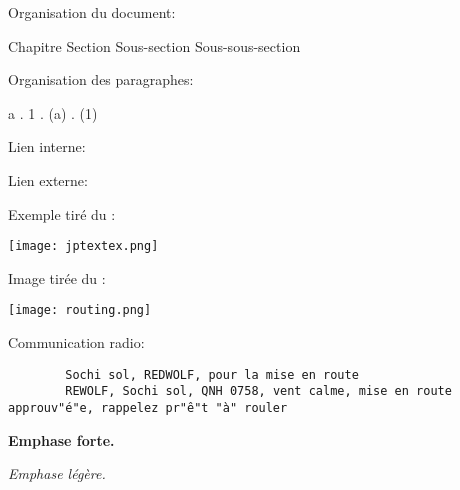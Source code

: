 
%

\e
    \item Organisation du document:

    {\Large Chapitre} {\large Section} Sous-section {\small Sous-sous-section}

    \item Organisation des paragraphes:

    {\Large a} . {\large 1} . (a) . {\small (1)}
    
    \item Lien interne:\label{internallink}
    
    
    \item Lien externe:
    
    \thirdwing    

    \item Exemple tiré du \jp{}:

    \texttt{[image: jptextex.png]}

    \item Image tirée du \jp{}:

    \texttt{[image: routing.png]}

    \item Communication radio:
    \begin{lstlisting}
        Sochi sol, REDWOLF, pour la mise en route
        REWOLF, Sochi sol, QNH 0758, vent calme, mise en route approuv"é"e, rappelez pr"ê"t "à" rouler
    \end{lstlisting}

    \item \textbf{Emphase forte.}

    \item \emph{Emphase légère.}

    \item {}
    
    
    \item {}

    \item {}

\ed 